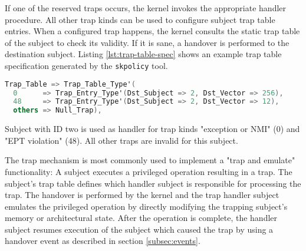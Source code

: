 If one of the reserved traps occurs, the kernel invokes the appropriate handler
procedure. All other trap kinds can be used to configure subject trap table
entries. When a configured trap happens, the kernel consults the static trap
table of the subject to check its validity. If it is sane, a handover is
performed to the destination subject.  Listing \ref{lst:trap-table-spec} shows
an example trap table specification generated by the \texttt{skpolicy} tool.

\begin{lstlisting}[language=Ada, label=lst:trap-table-spec, caption=Trap table specification]
Trap_Table => Trap_Table_Type'(
  0      => Trap_Entry_Type'(Dst_Subject => 2, Dst_Vector => 256),
  48     => Trap_Entry_Type'(Dst_Subject => 2, Dst_Vector => 12),
  others => Null_Trap),
\end{lstlisting}

Subject with ID two is used as handler for trap kinds "exception or
NMI" (0) and "EPT violation" (48). All other traps are invalid for
this subject.

The trap mechanism is most commonly used to implement a "trap and emulate"
functionality: A subject executes a privileged operation resulting in a trap.
The subject's trap table defines which handler subject is responsible for
processing the trap. The handover is performed by the kernel and the trap
handler subject emulates the privileged operation by directly modifying the
trapping subject's memory or architectural state. After the operation is
complete, the handler subject resumes execution of the subject which caused the
trap by using a handover event as described in section \ref{subsec:events}.
